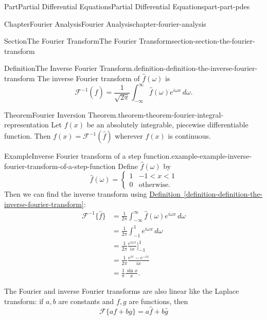 \documentclass[twoside,10pt,]{book}
\newcommand{\xreffont}{\relax}
\numberwithin{equation}{part}
\newcommand{\amp}{&}
\begin{document}
\begin{partptx}{Part}{Partial Differential Equations}{}{Partial Differential Equations}{}{}{part-part-pdes}
\begin{chapterptx}{Chapter}{Fourier Analysis}{}{Fourier Analysis}{}{}{chapter-fourier-analysis}
\begin{sectionptx}{Section}{The Fourier Transform}{}{The Fourier Transform}{}{}{section-section-the-fourier-transform}
\begin{definition}{Definition}{The Inverse Fourier Transform.}{definition-definition-the-inverse-fourier-transform}%
%
The inverse Fourier transform of \(\hat{f}(\omega)\) is%
\begin{equation*}
\mathcal{F}^{-1}(\hat{f}) = \frac{1}{\sqrt{2\pi}}\int_{-\infty}^{\infty}\hat{f}(\omega)e^{i\omega x}\,d\omega.
\end{equation*}
%
\end{definition}
\begin{theorem}{Theorem}{Fourier Inversion Theorem.}{}{theorem-theorem-fourier-integral-representation}%
%
Let \(f(x)\) be an absolutely integrable, piecewise differentiable function. Then \(f(x) = \mathcal{F}^{-1}(\hat{f})\) wherever \(f(x)\) is continuous.%
\end{theorem}
\begin{example}{Example}{Inverse Fourier transform of a step function.}{example-example-inverse-fourier-transform-of-a-step-function}%
Define \(\hat{f}(\omega)\) by%
\begin{equation*}
\hat{f}(\omega) = \begin{cases} 1 \amp -1 < x < 1 \\ 0 \amp \text{otherwise.}\end{cases}
\end{equation*}
Then we can find the inverse transform using \hyperref[definition-definition-the-inverse-fourier-transform]{Definition~{\xreffont\ref{definition-definition-the-inverse-fourier-transform}}}:%
\begin{align*}
\mathcal{F}^{-1}\{\hat{f}\} \amp = \frac{1}{2\pi}\int_{-\infty}^{\infty}\hat{f}(\omega)e^{i\omega x}\,d\omega \\
\amp = \frac{1}{2\pi}\int_{-1}^{1}e^{i\omega x}\,d\omega \\
\amp = \frac{1}{2\pi}\frac{e^{i\omega x}}{ix}\Big]_{-1}^{1} \\
\amp = \frac{1}{2\pi}\frac{e^{ix}-e^{-ix}}{ix} \\
\amp = \frac{1}{\pi}\frac{\sin x}{x}. 
\end{align*}
%
\end{example}
The Fourier and inverse Fourier transforms are also linear like the Laplace transform: if \(a,b\) are constants and \(f,g\) are functions, then%
\begin{equation*}
\mathcal{F}\{af+bg\} = a\hat{f}+b\hat{g}
\end{equation*}

\end{sectionptx}
\end{chapterptx}
\end{partptx}
\end{document}
